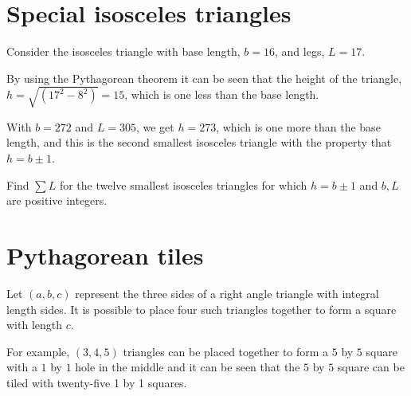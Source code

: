 \section{Special isosceles triangles} \label{pb.0138}

Consider the isosceles triangle with base length, $b = 16$, and legs, $L = 17$.

\begin{center}
\end{center}

By using the Pythagorean theorem it can be seen that the height of the triangle, $h = \sqrt{(17^2 - 8^2)} = 15$, which is one less than the base length.

With $b = 272$ and $L = 305$, we get $h = 273$, which is one more than the base length, and this is the second smallest isosceles triangle with the property that $h = b \pm 1$.

Find $\sum L$ for the twelve smallest isosceles triangles for which $h = b \pm 1$ and $b, L$ are positive integers.



\section{Pythagorean tiles} \label{pb.0139}

Let $(a, b, c)$ represent the three sides of a right angle triangle with integral length sides. It is possible to place four such triangles together to form a square with length $c$.

For example, $(3, 4, 5)$ triangles can be placed together to form a $5$ by $5$ square with a $1$ by $1$ hole in the middle and it can be seen that the $5$ by $5$ square can be tiled with twenty-five 1 by 1 squares.

\begin{center}
\end{center}

